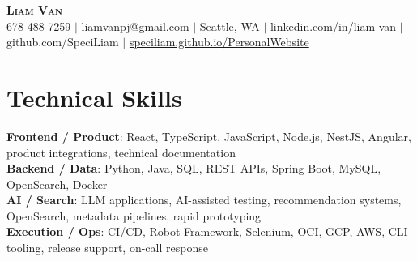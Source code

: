 \documentclass[letterpaper,11pt]{article}
\begin{document}

%
\begin{center}
    \textbf{\Huge \scshape Liam Van} \\ \vspace{1pt}
    \small 678-488-7259 $|$ \small {liamvanpj@gmail.com} $|$ Seattle, WA
 {{$|$ linkedin.com/in/liam-van} {$|$ github.com/SpeciLiam} {$|$ \href{https://speciliam.github.io/PersonalWebsite}{speciliam.github.io/PersonalWebsite}}}

\end{center}

\section{Technical Skills}
 \begin{itemize}[leftmargin=0.15in, label={}]
    \small{\item{
     \textbf{Frontend / Product}{: React, TypeScript, JavaScript, Node.js, NestJS, Angular, product integrations, technical documentation} \\
     \textbf{Backend / Data}{: Python, Java, SQL, REST APIs, Spring Boot, MySQL, OpenSearch, Docker} \\
     \textbf{AI / Search}{: LLM applications, AI-assisted testing, recommendation systems, OpenSearch, metadata pipelines, rapid prototyping} \\
     \textbf{Execution / Ops}{: CI/CD, Robot Framework, Selenium, OCI, GCP, AWS, CLI tooling, release support, on-call response} \\
    }}
 \end{itemize}
%
\end{document}
